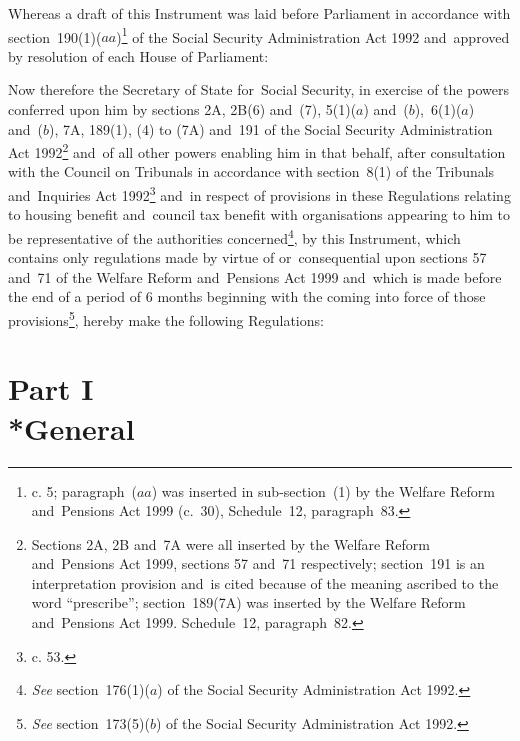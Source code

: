 \documentclass[12pt,a4paper]{article}
\title{\regstitle}
\author{S.I.\ 2000 No.\ 897}
\date{Made
28th March 2000\\
Coming into force
3rd April 2000}
\begin{document}
\maketitle

\noindent
Whereas a draft of this Instrument was laid before Parliament in accordance with section~190(1)($aa$)\footnote{ c. 5; paragraph~($aa$) was inserted in sub-section~(1) by the Welfare Reform and~Pensions Act 1999 (c.~30), Schedule~12, paragraph~83.} of the Social Security Administration Act 1992 and~approved by resolution of each House of Parliament:

Now therefore the Secretary of State for~Social Security, in exercise of the powers conferred upon him by sections 2A, 2B(6) and~(7), 5(1)($a$)  and~($b$),~6(1)($a$)  and~($b$), 7A, 189(1), (4) to (7A) and~191 of the Social Security Administration Act 1992\footnote{\frenchspacing Sections 2A, 2B and~7A were all inserted by the Welfare Reform and~Pensions Act 1999, sections 57 and~71 respectively; section~191 is an interpretation provision and~is cited because of the meaning ascribed to the word “prescribe”; section~189(7A) was inserted by the Welfare Reform and~Pensions Act 1999. Schedule~12, paragraph~82.} and~of all other powers enabling him in that behalf, after consultation with the Council on Tribunals in accordance with section~8(1) of the Tribunals and~Inquiries Act 1992\footnote{ c. 53.} and~in respect of provisions in these Regulations relating to housing benefit and~council tax benefit with organisations appearing to him to be representative of the authorities concerned\footnote{\frenchspacing \emph{See} section~176(1)($a$) of the Social Security Administration Act 1992.}, by this Instrument, which contains only regulations made by virtue of or~consequential upon sections 57 and~71 of the Welfare Reform and~Pensions Act 1999 and~which is made before the end of a period of 6 months beginning with the coming into force of those provisions\footnote{\frenchspacing \emph{See} section~173(5)($b$) of the Social Security Administration Act 1992.}, hereby make the following Regulations: 

{\sloppy

\tableofcontents

}

\bigskip

\setcounter{secnumdepth}{-2}

\section[Part I — General]{Part I\\*General}
\end{document}
